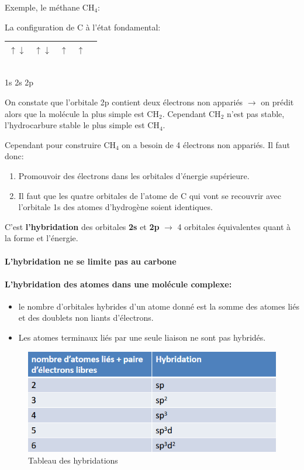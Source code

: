 \documentclass[10pt,a4paper]{book}
\begin{document}
Exemple, le méthane CH$_4$:
\begin{center}
La configuration de C à l'état fondamental: \\ \vspace{0.5cm}
\begin{tabular}{| c | c | c | c | c |}
\hline
$\uparrow\downarrow$ & $\uparrow\downarrow$ & $\uparrow$ & $\uparrow$  & \: \\
\hline
\end{tabular}\\
1s \quad 2s \quad \qquad 2p
\end{center}
\par On constate que l'orbitale 2p contient deux électrons non appariés $\rightarrow$ on prédit alors que la molécule la plus simple est CH$_2$. Cependant CH$_2$ n'est pas stable, l'hydrocarbure stable le plus simple est CH$_4$. \par
Cependant pour construire CH$_4$ on a besoin de 4 électrons non appariés. Il faut donc:
\begin{enumerate}
\item Promouvoir des électrons dans les orbitales d'énergie supérieure.
\item Il faut que les quatre orbitales de l'atome de C qui vont se recouvrir avec l'orbitale 1s des atomes d'hydrogène soient identiques.
\end{enumerate}
C'est \textbf{l'hybridation} des orbitales \textbf{2s} et \textbf{2p} $\rightarrow$ 4 orbitales équivalentes quant à la forme et l'énergie.
\paragraph{L'hybridation ne se limite pas au carbone} %
\paragraph{L'hybridation des atomes dans une molécule complexe:}
\begin{itemize}
\item le nombre d'orbitales hybrides d'un atome donné est la somme des atomes liés et des doublets non liants d'électrons.
\item Les atomes terminaux liés par une seule liaison ne sont pas hybridés.
\end{itemize}
\begin{figure}[h!]
\begin{center}
\includegraphics[scale=0.65]{./assets/hybridation_table.png}
\caption{Tableau des hybridations}
\label{fig:hybridation_table}
\end{center}
\end{figure}
\end{document}
